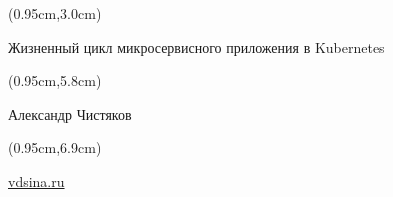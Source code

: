 \documentclass[xetex,18pt,aspectratio=43]{beamer}
\title[Жизненный цикл микросервисного приложения в Kubernetes]{}
\author[Александр Чистяков, vdsina.ru]{}
\date{}
\newcommand\Bigfont{\fontsize{20}{20}\selectfont}
\newcommand\Authorfont{\fontsize{17}{17}\selectfont}
\newcommand\Orgfont{\fontsize{13}{13}\selectfont}
\begin{document}
{ %
    \begin{frame}[plain]
      \begin{textblock*}{\framewidth}(0.95cm,3.0cm) %
        \Bigfont
          \begin{center}
          Жизненный цикл микросервисного приложения в Kubernetes
          \end{center}
      \end{textblock*}
      \begin{textblock*}{\framewidth}(0.95cm,5.8cm) %
        \Authorfont
          \begin{center}
          Александр Чистяков
          \end{center}
      \end{textblock*}
      \begin{textblock*}{\framewidth}(0.95cm,6.9cm) %
        \Orgfont
          \begin{center}
          \href{https://vdsina.ru}{\color{blue}vdsina.ru}
          \end{center}
      \end{textblock*}
     \end{frame}
}
\end{document}
